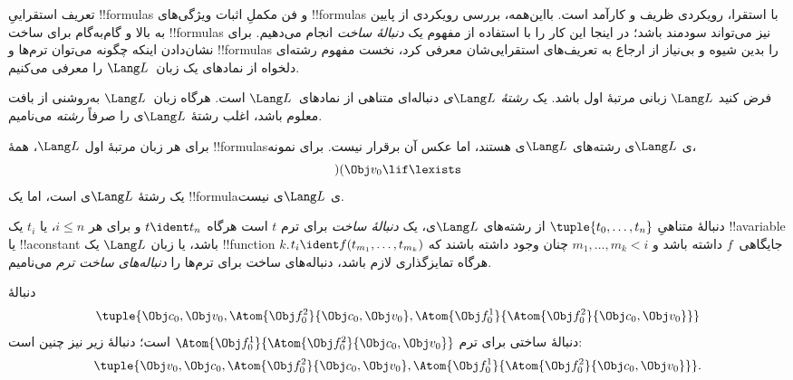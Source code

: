 \documentclass[../../../include/open-logic-section]{subfiles}
\begin{document}


تعریف استقراییِ !!{formula}s و فن مکملِ اثبات ویژگی‌های !!{formula}s با
استقرا، رویکردی ظریف و کارآمد است. بااین‌همه، بررسی رویکردی از پایین به بالا
و گام‌به‌گام برای ساخت !!{formula}s نیز می‌تواند سودمند باشد؛ در اینجا این
کار را با استفاده از مفهوم یک \emph{دنبالهٔ ساخت} انجام می‌دهیم.
%
برای نشان‌دادن اینکه چگونه می‌توان ترم‌ها و !!{formula}s را بدین شیوه و
بی‌نیاز از ارجاع به تعریف‌های استقرایی‌شان معرفی کرد، نخست مفهوم رشته‌ای
دلخواه از نمادهای یک زبان~$\Lang L$ را معرفی می‌کنیم.

\begin{defn}[رشته‌ها]
فرض کنید $\Lang L$ زبانی مرتبهٔ اول باشد. یک \emph{رشتهٔ $\Lang L$ی}
دنباله‌ای متناهی از نمادهای~$\Lang L$ است. هرگاه زبان~$\Lang L$ به‌روشنی
از بافت معلوم باشد، اغلب رشتهٔ $\Lang L$ی را صرفاً \emph{رشته} می‌نامیم.
\end{defn}

\begin{ex}
برای هر زبان مرتبهٔ اول $\Lang L$، همهٔ !!{formula}sی $\Lang L$ی
رشته‌های $\Lang L$ی هستند، اما عکس آن برقرار نیست. برای نمونه،
\[)(\Obj v_0\lif\lexists\]
یک رشتهٔ $\Lang L$ی است، اما یک !!{formula}ی $\Lang L$ی نیست.
\end{ex}

\begin{defn}
دنبالهٔ متناهیِ $\tuple{t_0,\dotsc,t_n}$ از رشته‌های $\Lang L$ی، یک
\emph{دنبالهٔ ساخت} برای ترم $t$ است هرگاه $t \ident t_n$ و برای هر
$i \leq n$، یا $t_i$ یک !!a{variable} یا !!a{constant} باشد، یا زبان
$\Lang L$ یک !!{function} $k$جایگاهی~$f$ داشته باشد و
$m_1,\dotsc,m_k < i$ چنان وجود داشته باشند که
$t_i \ident f(t_{m_1},\dotsc,t_{m_k})$. هرگاه تمایزگذاری لازم باشد،
دنباله‌های ساخت برای ترم‌ها را \emph{دنباله‌های ساخت ترم} می‌نامیم.
\end{defn}

\begin{ex}
دنبالهٔ
\[
    \tuple{\Obj c_0, \Obj v_0, \Atom{\Obj f^2_0}{\Obj c_0, \Obj v_0}, \Atom{\Obj f^1_0}{\Atom{\Obj f^2_0}{\Obj c_0, \Obj v_0}}}
\]
دنبالهٔ ساختی برای ترم $\Atom{\Obj f^1_0}{\Atom{\Obj
f^2_0}{\Obj c_0, \Obj v_0}}$ است؛ دنبالهٔ زیر نیز چنین است:
\[
    \tuple{\Obj v_0, \Obj c_0, \Atom{\Obj f^2_0}{\Obj c_0, \Obj v_0}, \Atom{\Obj f^1_0}{\Atom{\Obj f^2_0}{\Obj c_0, \Obj v_0}}}.
\]
\end{ex}
\end{document}
